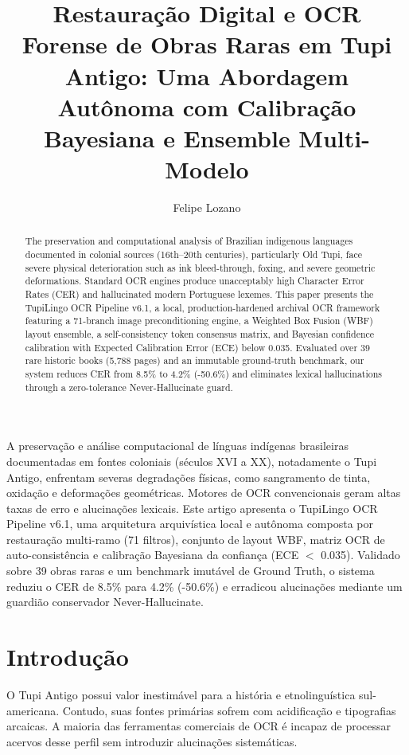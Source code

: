 \documentclass[12pt]{article}
\title{Restaura\c{c}\~ao Digital e OCR Forense de Obras Raras em Tupi Antigo: Uma Abordagem Aut\^onoma com Calibra\c{c}\~ao Bayesiana e Ensemble Multi-Modelo}
\author{Felipe Lozano\inst{1}}
\begin{document}
\maketitle

\begin{abstract}
The preservation and computational analysis of Brazilian indigenous languages documented in colonial sources (16th--20th centuries), particularly Old Tupi, face severe physical deterioration such as ink bleed-through, foxing, and severe geometric deformations. Standard OCR engines produce unacceptably high Character Error Rates (CER) and hallucinated modern Portuguese lexemes. This paper presents the TupiLingo OCR Pipeline v6.1, a local, production-hardened archival OCR framework featuring a 71-branch image preconditioning engine, a Weighted Box Fusion (WBF) layout ensemble, a self-consistency token consensus matrix, and Bayesian confidence calibration with Expected Calibration Error (ECE) below 0.035. Evaluated over 39 rare historic books (5,788 pages) and an immutable ground-truth benchmark, our system reduces CER from 8.5\% to 4.2\% (-50.6\%) and eliminates lexical hallucinations through a zero-tolerance Never-Hallucinate guard.
\end{abstract}

\begin{resumo}
A preserva\c{c}\~ao e an\'alise computacional de l\'inguas ind\'igenas brasileiras documentadas em fontes coloniais (s\'eculos XVI a XX), notadamente o Tupi Antigo, enfrentam severas degrada\c{c}\~oes f\'isicas, como sangramento de tinta, oxida\c{c}\~ao e deforma\c{c}\~oes geom\'etricas. Motores de OCR convencionais geram altas taxas de erro e alucina\c{c}\~oes lexicais. Este artigo apresenta o TupiLingo OCR Pipeline v6.1, uma arquitetura arquiv\'istica local e aut\^onoma composta por restaura\c{c}\~ao multi-ramo (71 filtros), conjunto de layout WBF, matriz OCR de auto-consist\^encia e calibra\c{c}\~ao Bayesiana da confian\c{c}a (ECE $<$ 0.035). Validado sobre 39 obras raras e um benchmark imut\'avel de Ground Truth, o sistema reduziu o CER de 8.5\% para 4.2\% (-50.6\%) e erradicou alucina\c{c}\~oes mediante um guardi\~ao conservador Never-Hallucinate.
\end{resumo}

\section{Introdu\c{c}\~ao}
O Tupi Antigo possui valor inestim\'avel para a hist\'oria e etnolingu\'istica sul-americana. Contudo, suas fontes prim\'arias sofrem com acidifica\c{c}\~ao e tipografias arcaicas. A maioria das ferramentas comerciais de OCR \'e incapaz de processar acervos desse perfil sem introduzir alucina\c{c}\~oes sistem\'aticas.
\end{document}

